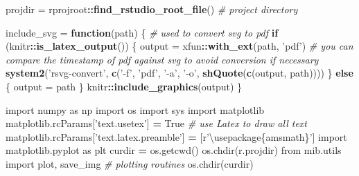 \documentclass[]{book}
\newenvironment{Shaded}{\begin{snugshade}}{\end{snugshade}}
\newcommand{\CommentTok}[1]{\textcolor[rgb]{0.56,0.35,0.01}{\textit{#1}}}
\newcommand{\ControlFlowTok}[1]{\textcolor[rgb]{0.13,0.29,0.53}{\textbf{#1}}}
\newcommand{\DataTypeTok}[1]{\textcolor[rgb]{0.13,0.29,0.53}{#1}}
\newcommand{\ImportTok}[1]{#1}
\newcommand{\KeywordTok}[1]{\textcolor[rgb]{0.13,0.29,0.53}{\textbf{#1}}}
\newcommand{\NormalTok}[1]{#1}
\newcommand{\OperatorTok}[1]{\textcolor[rgb]{0.81,0.36,0.00}{\textbf{#1}}}
\newcommand{\OtherTok}[1]{\textcolor[rgb]{0.56,0.35,0.01}{#1}}
\newcommand{\SpecialCharTok}[1]{\textcolor[rgb]{0.00,0.00,0.00}{#1}}
\newcommand{\StringTok}[1]{\textcolor[rgb]{0.31,0.60,0.02}{#1}}
\newcommand{\VariableTok}[1]{\textcolor[rgb]{0.00,0.00,0.00}{#1}}
\newcommand{\VerbatimStringTok}[1]{\textcolor[rgb]{0.31,0.60,0.02}{#1}}
\begin{document}
\begin{Shaded}
\begin{Highlighting}[]
\NormalTok{projdir =}\StringTok{ }\NormalTok{rprojroot}\OperatorTok{::}\KeywordTok{find_rstudio_root_file}\NormalTok{() }\CommentTok{# project directory}

\NormalTok{include_svg =}\StringTok{ }\ControlFlowTok{function}\NormalTok{(path) \{ }\CommentTok{# used to convert svg to pdf}
  \ControlFlowTok{if}\NormalTok{ (knitr}\OperatorTok{::}\KeywordTok{is_latex_output}\NormalTok{()) \{}
\NormalTok{    output =}\StringTok{ }\NormalTok{xfun}\OperatorTok{::}\KeywordTok{with_ext}\NormalTok{(path, }\StringTok{'pdf'}\NormalTok{)}
    \CommentTok{# you can compare the timestamp of pdf against svg to avoid conversion if necessary}
    \KeywordTok{system2}\NormalTok{(}\StringTok{'rsvg-convert'}\NormalTok{, }\KeywordTok{c}\NormalTok{(}\StringTok{'-f'}\NormalTok{, }\StringTok{'pdf'}\NormalTok{, }\StringTok{'-a'}\NormalTok{, }\StringTok{'-o'}\NormalTok{, }\KeywordTok{shQuote}\NormalTok{(}\KeywordTok{c}\NormalTok{(output, path))))}
\NormalTok{  \} }\ControlFlowTok{else}\NormalTok{ \{}
\NormalTok{    output =}\StringTok{ }\NormalTok{path}
\NormalTok{  \}}
\NormalTok{  knitr}\OperatorTok{::}\KeywordTok{include_graphics}\NormalTok{(output)}
\NormalTok{\}}
\end{Highlighting}
\end{Shaded}

\begin{Shaded}
\end{Shaded}

\begin{Shaded}
\begin{Highlighting}[]
\ImportTok{import}\NormalTok{ numpy }\ImportTok{as}\NormalTok{ np}
\ImportTok{import}\NormalTok{ os}
\ImportTok{import}\NormalTok{ sys}
\ImportTok{import}\NormalTok{ matplotlib}
\NormalTok{matplotlib.rcParams[}\StringTok{'text.usetex'}\NormalTok{] }\OperatorTok{=} \VariableTok{True} \CommentTok{# use Latex to draw all text}
\NormalTok{matplotlib.rcParams[}\StringTok{'text.latex.preamble'}\NormalTok{] }\OperatorTok{=}\NormalTok{ [}\VerbatimStringTok{r'\textbackslash{}usepackage}\SpecialCharTok{\{amsmath\}}\VerbatimStringTok{'}\NormalTok{]}
\ImportTok{import}\NormalTok{ matplotlib.pyplot }\ImportTok{as}\NormalTok{ plt}
\NormalTok{curdir }\OperatorTok{=}\NormalTok{ os.getcwd()}
\NormalTok{os.chdir(r.projdir)}
\ImportTok{from}\NormalTok{ mib.utils }\ImportTok{import}\NormalTok{ plot, save_img }\CommentTok{# plotting routines}
\NormalTok{os.chdir(curdir)}
\end{Highlighting}
\end{Shaded}
\end{document}

